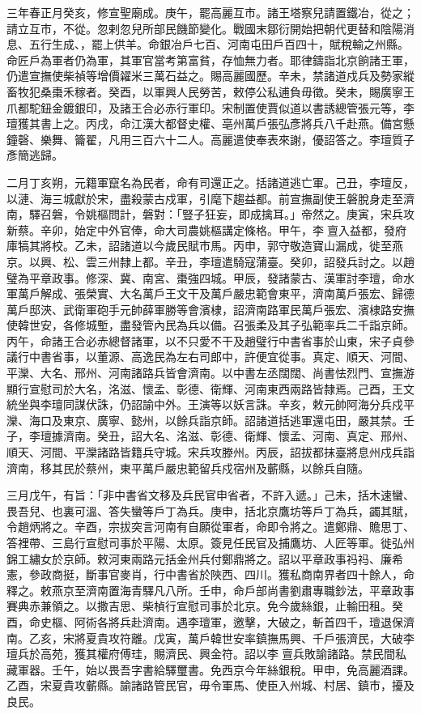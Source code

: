 
\begin{pinyinscope}

 三年春正月癸亥，修宣聖廟成。庚午，罷高麗互市。諸王塔察兒請置鐵冶，從之；請立互市，不從。忽剌忽兒所部民饑節變化。戰國末鄒衍開始把朝代更替和陰陽消息、五行生成、，罷上供羊。命銀冶戶七百、河南屯田戶百四十，賦稅輸之州縣。命匠戶為軍者仍為軍，其軍官當考第富貧，存恤無力者。耶律鑄詣北京餉諸王軍，仍遣宣撫使柴禎等增價糴米三萬石益之。賜高麗國歷。辛未，禁諸道戍兵及勢家縱畜牧犯桑棗禾稼者。癸酉，以軍興人民勞苦，敕停公私逋負毋徵。癸未，賜廣寧王爪都駝鈕金鍍銀印，及諸王合必赤行軍印。宋制置使賈似道以書誘總管張元等，李璮獲其書上之。丙戌，命江漢大都督史權、亳州萬戶張弘彥將兵八千赴燕。備宮懸鐘磬、樂舞、籥翟，凡用三百六十二人。高麗遣使奉表來謝，優詔答之。李璮質子彥簡逃歸。



 二月丁亥朔，元籍軍竄名為民者，命有司還正之。括諸道逃亡軍。己丑，李璮反，以漣、海三城獻於宋，盡殺蒙古戍軍，引麾下趨益都。前宣撫副使王磐脫身走至濟南，驛召磐，令姚樞問計，磐對：「豎子狂妄，即成擒耳。」帝然之。庚寅，宋兵攻新蔡。辛卯，始定中外官俸，命大司農姚樞講定條格。甲午，李亶入益都，發府庫犒其將校。乙未，詔諸道以今歲民賦市馬。丙申，郭守敬造寶山漏成，徙至燕京。以興、松、雲三州隸上都。辛丑，李璮遣騎寇蒲臺。癸卯，詔發兵討之。以趙璧為平章政事。修深、冀、南宮、棗強四城。甲辰，發諸蒙古、漢軍討李璮，命水軍萬戶解成、張榮實、大名萬戶王文干及萬戶嚴忠範會東平，濟南萬戶張宏、歸德萬戶邸浹、武衛軍砲手元帥薛軍勝等會濱棣，詔濟南路軍民萬戶張宏、濱棣路安撫使韓世安，各修城塹，盡發管內民為兵以備。召張柔及其子弘範率兵二千詣京師。丙午，命諸王合必赤總督諸軍，以不只愛不干及趙璧行中書省事於山東，宋子貞參議行中書省事，以董源、高逸民為左右司郎中，許便宜從事。真定、順天、河間、平灤、大名、邢州、河南諸路兵皆會濟南。以中書左丞闊闊、尚書怯烈門、宣撫游顯行宣慰司於大名，洺滋、懷孟、彰德、衛輝、河南東西兩路皆隸焉。己酉，王文統坐與李璮同謀伏誅，仍詔諭中外。王演等以妖言誅。辛亥，敕元帥阿海分兵戍平灤、海口及東京、廣寧、懿州，以餘兵詣京師。詔諸道括逃軍還屯田，嚴其禁。壬子，李璮據濟南。癸丑，詔大名、洺滋、彰德、衛輝、懷孟、河南、真定、邢州、順天、河間、平灤諸路皆籍兵守城。宋兵攻滕州。丙辰，詔拔都抹臺將息州戍兵詣濟南，移其民於蔡州，東平萬戶嚴忠範留兵戍宿州及蘄縣，以餘兵自隨。



 三月戊午，有旨：「非中書省文移及兵民官申省者，不許入遞。」己未，括木速蠻、畏吾兒、也裏可溫、答失蠻等戶丁為兵。庚申，括北京鷹坊等戶丁為兵，蠲其賦，令趙炳將之。辛酉，宗拔突言河南有自願從軍者，命即令將之。遣鄭鼎、贍思丁、答裡帶、三島行宣慰司事於平陽、太原。簽見任民官及捕鷹坊、人匠等軍。徙弘州錦工繡女於京師。敕河東兩路元括金州兵付鄭鼎將之。詔以平章政事祃祃、廉希憲，參政商挺，斷事官麥肖，行中書省於陜西、四川。獲私商南界者四十餘人，命釋之。敕燕京至濟南置海青驛凡八所。壬申，命戶部尚書劉肅專職鈔法，平章政事賽典赤兼領之。以撒吉思、柴楨行宣慰司事於北京。免今歲絲銀，止輸田租。癸酉，命史樞、阿術各將兵赴濟南。遇李璮軍，邀擊，大破之，斬首四千，璮退保濟南。乙亥，宋將夏貴攻符離。戊寅，萬戶韓世安率鎮撫馬興、千戶張濟民，大破李璮兵於高苑，獲其權府傅珪，賜濟民、興金符。詔以李亶兵敗諭諸路。禁民間私藏軍器。壬午，始以畏吾字書給驛璽書。免西京今年絲銀稅。甲申，免高麗酒課。乙酉，宋夏貴攻蘄縣。諭諸路管民官，毋令軍馬、使臣入州城、村居、鎮市，擾及良民。




\end{pinyinscope}

